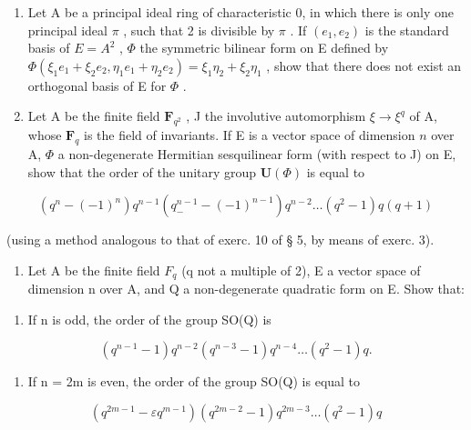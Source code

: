 \begin{enumerate}
\def\labelenumi{\arabic{enumi})}
\setcounter{enumi}{10}
\item
  Let A be a principal ideal ring of characteristic 0, in which there is only one principal ideal \(\pi\) , such that 2 is divisible by \(\pi\) . If \((e_1, e_2)\) is the standard basis of \(E = A^2\) , \(\Phi\) the symmetric bilinear form on E defined by \(\Phi(\xi_1 e_1 + \xi_2 e_2, \eta_1 e_1 + \eta_2 e_2) = \xi_1 \eta_2 + \xi_2 \eta_1\) , show that there does not exist an orthogonal basis of E for \(\Phi\) .
\item
  Let A be the finite field \(\mathbf{F}_{q^{2}}\) , J the involutive automorphism \(\xi \to \xi^{q}\) of A, whose \(\mathbf{F}_{q}\) is the field of invariants. If E is a vector space of dimension \(n\) over A, \(\Phi\) a non-degenerate Hermitian sesquilinear form (with respect to J) on E, show that the order of the unitary group \(\mathbf{U}(\Phi)\) is equal to
\end{enumerate}

\[
(q ^ {n} - (- 1) ^ {n}) q ^ {n - 1} (q _ {-} ^ {n - 1} - (- 1) ^ {n - 1}) q ^ {n - 2} \dots (q ^ {2} - 1) q (q + 1)
\]

(using a method analogous to that of exerc. 10 of § 5, by means of exerc. 3).

\begin{enumerate}
\def\labelenumi{\arabic{enumi})}
\setcounter{enumi}{12}
\tightlist
\item
  Let A be the finite field \(F_{q}\) (q not a multiple of 2), E a vector space of dimension n over A, and Q a non-degenerate quadratic form on E. Show that:
\end{enumerate}

\begin{enumerate}
\def\labelenumi{\alph{enumi})}
\tightlist
\item
  If n is odd, the order of the group SO(Q) is
\end{enumerate}

\[
(q ^ {n - 1} - 1) q ^ {n - 2} (q ^ {n - 3} - 1) q ^ {n - 4} \dots (q ^ {2} - 1) q.
\]

\begin{enumerate}
\def\labelenumi{\alph{enumi})}
\setcounter{enumi}{1}
\tightlist
\item
  If n = 2m is even, the order of the group SO(Q) is equal to
\end{enumerate}

\[
(q ^ {2 m - 1} - \varepsilon q ^ {m - 1}) (q ^ {2 m - 2} - 1) q ^ {2 m - 3} \dots (q ^ {2} - 1) q
\]

